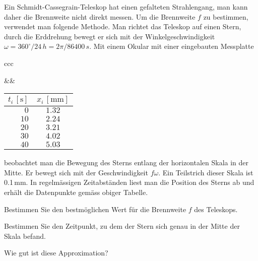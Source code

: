 Ein Schmidt-Cassegrain-Teleskop hat einen gefalteten Strahlengang,
man kann daher die Brennweite nicht direkt messen.
Um die Brennweite $f$ zu bestimmen, verwendet man folgende Methode.
Man richtet das Teleskop auf einen Stern, durch die Erddrehung bewegt
er sich mit der Winkelgeschwindigkeit
$\omega=360^\circ/24\,h=2\pi/86400\,s$.
Mit einem Okular mit einer eingebauten Messplatte
\begin{center}
\begin{tabular}{ccc}
\begin{minipage}{0.25\hsize}
\end{minipage}&\qquad\qquad\qquad&
\begin{minipage}{0.2\hsize}
\begin{tabular}{>{$}r<{$}|>{$}c<{$}}
 t_i\,[\text{s}]&x_i\,[\text{mm}]\\
\hline
 0&1.32\\
10&2.24\\
20&3.21\\
30&4.02\\
40&5.03
\end{tabular}
\end{minipage}
\end{tabular}
\end{center}
beobachtet man die Bewegung des Sterns entlang der horizontalen Skala
in der Mitte.
Er bewegt sich mit der Geschwindigkeit $f\omega$.
Ein Teilstrich dieser Skala ist 0.1\,mm.
In regelmässigen Zeitabständen liest man die Position des Sterns ab
und erhält die Datenpunkte gemäss obiger Tabelle.
\begin{teilaufgaben}
\item
Bestimmen Sie den bestmöglichen Wert für die Brennweite $f$ des Teleskops.
\item
Bestimmen Sie den Zeitpunkt, zu dem der Stern sich genau in der Mitte der
Skala befand.
\item
Wie gut ist diese Approximation?
\end{teilaufgaben}


